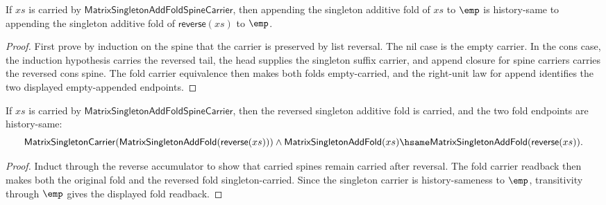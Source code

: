\begin{theorem}
\label{thm:matrix-singleton-add-fold-reverse-empty-append-hsame}
If \(xs\) is carried by \(\mathsf{MatrixSingletonAddFoldSpineCarrier}\), then
appending the singleton additive fold of \(xs\) to \(\emp\) is history-same to
appending the singleton additive fold of \(\mathsf{reverse}(xs)\) to \(\emp\).
\end{theorem}
\begin{proof}
First prove by induction on the spine that the carrier is preserved by list
reversal. The nil case is the empty carrier. In the cons case, the induction
hypothesis carries the reversed tail, the head supplies the singleton suffix
carrier, and append closure for spine carriers carries the reversed cons
spine. The fold carrier equivalence then makes both folds empty-carried, and
the right-unit law for append identifies the two displayed empty-appended
endpoints.
\end{proof}

\begin{theorem}
\label{thm:matrix-singleton-add-fold-reverse-carrier-readback}
If \(xs\) is carried by \(\mathsf{MatrixSingletonAddFoldSpineCarrier}\), then
the reversed singleton additive fold is carried, and the two fold endpoints are
history-same:
$$
\mathsf{MatrixSingletonCarrier}(\mathsf{MatrixSingletonAddFold}(\mathsf{reverse}(xs)))
\land
\mathsf{MatrixSingletonAddFold}(xs)\hsame
\mathsf{MatrixSingletonAddFold}(\mathsf{reverse}(xs)).
$$
\end{theorem}
\begin{proof}
Induct through the reverse accumulator to show that carried spines remain
carried after reversal. The fold carrier readback then makes both the original
fold and the reversed fold singleton-carried. Since the singleton carrier is
history-sameness to \(\emp\), transitivity through \(\emp\) gives the displayed
fold readback.
\end{proof}

